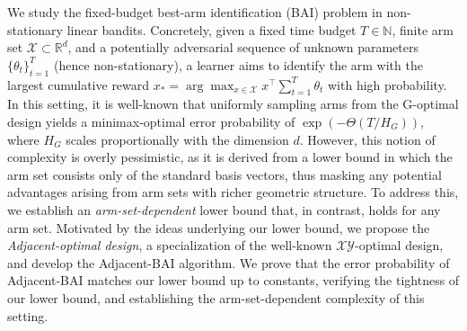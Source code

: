 We study the fixed-budget best-arm identification (BAI) problem in non-stationary linear bandits.  Concretely, given a fixed time budget $T\in \mathbb{N}$, finite arm set $\mathcal{X} \subset \mathbb{R}^d$, and a potentially adversarial sequence of unknown parameters $\lbrace \theta_t\rbrace_{t=1}^{T}$ (hence non-stationary), a learner aims to identify the arm with the largest cumulative reward $x_* = \arg\max_{x \in \mathcal{X}} x^\top\sum_{t=1}^T \theta_t$ with high probability. In this setting, it is well-known that uniformly sampling arms from the G-optimal design yields a minimax-optimal error probability of $\exp\left(-\Theta\left(T /  H_{G}\right)\right)$, where $H_{G}$ scales proportionally with the dimension $d$. However, this notion of complexity is overly pessimistic, as it is derived from a lower bound in which the arm set consists only of the standard basis vectors, thus masking any potential advantages arising from arm sets with richer geometric structure. To address this, we establish an \textit{arm-set-dependent} lower bound that, in contrast, holds for any arm set. Motivated by the ideas underlying our lower bound, we propose the \textit{Adjacent-optimal design}, a specialization of the well-known $\mathcal{XY}$-optimal design, and develop the \textsf{Adjacent-BAI} algorithm. We prove that the error probability of \textsf{Adjacent-BAI} matches our lower bound up to constants, verifying the tightness of our lower bound, and establishing the arm-set-dependent complexity of this setting.

